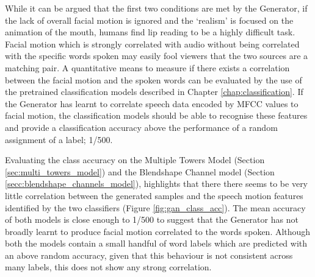 While it can be argued that the first two conditions are met by the Generator, if the lack of overall facial motion is ignored and the `realism' is focused on the animation of the mouth, humans find lip reading to be a highly difficult task.
Facial motion which is strongly correlated with audio without being correlated with the specific words spoken may easily fool viewers that the two sources are a matching pair.
A quantitative means to measure if there exists a correlation between the facial motion and the spoken words can be evaluated by the use of the pretrained classification models described in Chapter \ref{chap:classification}.
If the Generator has learnt to correlate speech data encoded by MFCC values to facial motion, the classification models should be able to recognise these features and provide a classification accuracy above the performance of a random assignment of a label; 1/500.

Evaluating the class accuracy on the Multiple Towers Model (Section \ref{sec:multi_towers_model}) and the Blendshape Channel model (Section \ref{secc:blendshape_channels_model}), highlights that there there seems to be very little correlation between the generated samples and the speech motion features identified by the two classifiers (Figure \ref{fig:gan_class_acc}).
The mean accuracy of both models is close enough to 1/500 to suggest that the Generator has not broadly learnt to produce facial motion correlated to the words spoken.
Although both the models contain a small handful of word labels which are predicted with an above random accuracy, given that this behaviour is not consistent across many labels, this does not show any strong correlation.

